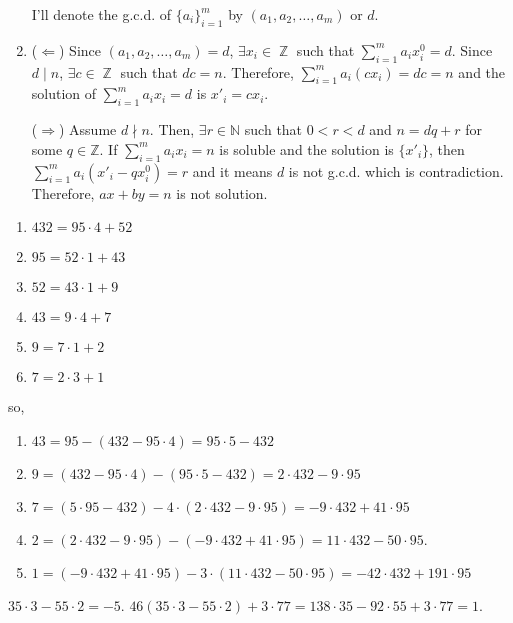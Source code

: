 \documentclass[12pt]{article}
\newenvironment{problem}[2][Problem]{\begin{trivlist}
\item[\hskip \labelsep {\bfseries #1}\hskip \labelsep {\bfseries #2.}]}{\end{trivlist}}
\DeclareMathOperator{\zz}{\mathbb{Z}}
\begin{document}
\begin{enumerate}
    I'll denote the g.c.d. of $\{a_i\}_{i=1}^m$ by $(a_1, a_2, \ldots, a_m)$ or $d$.
    
    \item[(c)] ($\Leftarrow$) Since $(a_1, a_2, \ldots, a_m)=d$, $\exists x_i\in \zz$ such that $\sum\limits_{i=1}^m a_i x^0_i=d$. Since $d\mid n$, $\exists c\in \zz$ such that $dc=n$. Therefore, $\sum\limits_{i=1}^m a_i (cx_i)=dc=n$ and the solution of $\sum\limits_{i=1}^m a_i x_i=d$ is $x'_i=cx_i$.
    
    ($\Rightarrow$) Assume $d\nmid n$. Then, $\exists r\in \mathbb{N}$ such that $0<r<d$ and $n=dq+r$ for some $q\in \mathbb{Z}$. If $\sum\limits_{i=1}^m a_i x_i=n$ is soluble and the solution is $\{x'_i\}$, then $\sum\limits_{i=1}^m a_i(x'_i-qx^0_i)=r$ and it means $d$ is not g.c.d. which is contradiction. Therefore, $ax+by=n$ is not solution.
\end{enumerate}




\begin{problem}{2}
\end{problem}
\begin{enumerate}
\item $432=95\cdot 4+52$
\item $95=52\cdot 1+43$
\item $52=43\cdot 1+9$
\item $43=9\cdot 4+7$
\item $9=7 \cdot 1+2$
\item $7=2\cdot 3 +1$
\end{enumerate}
so,
\begin{enumerate}
\item $43=95-(432-95\cdot 4)=95\cdot 5-432$
\item $9=(432-95\cdot 4)-(95\cdot 5-432)=2\cdot 432 - 9\cdot 95$
\item $7=(5\cdot 95-432)-4\cdot (2\cdot 432 - 9\cdot 95)=-9\cdot 432 + 41\cdot 95$
\item $2=(2\cdot 432 - 9\cdot 95)-(-9\cdot 432 + 41\cdot 95)=11\cdot 432 - 50\cdot 95$.
\item $1=(-9\cdot 432 + 41\cdot 95)-3\cdot(11\cdot 432 - 50\cdot 95)=-42\cdot 432 + 191 \cdot 95$
\end{enumerate}



\begin{problem}{3}
\end{problem}
$35\cdot 3- 55\cdot 2=-5$. $46(35\cdot 3- 55\cdot 2)+3\cdot 77=138\cdot 35-92 \cdot 55+3\cdot 77=1$.
\end{document}

